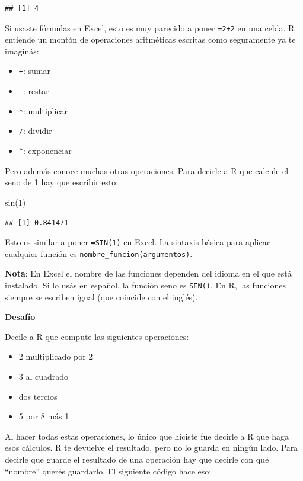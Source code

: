 \documentclass[
  openany]{book}
\newenvironment{Shaded}{\begin{snugshade}}{\end{snugshade}}
\newcommand{\DecValTok}[1]{\textcolor[rgb]{0.00,0.00,0.81}{#1}}
\newcommand{\FunctionTok}[1]{\textcolor[rgb]{0.00,0.00,0.00}{#1}}
\newcommand{\NormalTok}[1]{#1}
\providecommand{\tightlist}{%
  \setlength{\itemsep}{0pt}\setlength{\parskip}{0pt}}
\begin{document}
\begin{verbatim}
## [1] 4
\end{verbatim}

Si usaste fórmulas en Excel, esto es muy parecido a poner \texttt{=2+2} en una celda.
R entiende un montón de operaciones aritméticas escritas como seguramente ya te imaginás:

\begin{itemize}
\tightlist
\item
  \texttt{+}: sumar
\item
  \texttt{-}: restar
\item
  \texttt{*}: multiplicar
\item
  \texttt{/}: dividir
\item
  \texttt{\^{}}: exponenciar
\end{itemize}

Pero además conoce muchas otras operaciones.
Para decirle a R que calcule el seno de 1 hay que escribir esto:

\begin{Shaded}
\begin{Highlighting}[]
\FunctionTok{sin}\NormalTok{(}\DecValTok{1}\NormalTok{)}
\end{Highlighting}
\end{Shaded}

\begin{verbatim}
## [1] 0.841471
\end{verbatim}

Esto es similar a poner \texttt{=SIN(1)} en Excel.
La sintaxis básica para aplicar cualquier función es \texttt{nombre\_funcion(argumentos)}.

\textbf{Nota}: En Excel el nombre de las funciones dependen del idioma en el que está instalado.
Si lo usás en español, la función seno es \texttt{SEN()}.
En R, las funciones siempre se escriben igual (que coincide con el inglés).

\textbf{Desafío}

Decile a R que compute las siguientes operaciones:

\begin{itemize}
\tightlist
\item
  2 multiplicado por 2
\item
  3 al cuadrado
\item
  dos tercios
\item
  5 por 8 más 1
\end{itemize}

Al hacer todas estas operaciones, lo único que hiciste fue decirle a R que haga esos cálculos.
R te devuelve el resultado, pero no lo guarda en ningún lado.
Para decirle que guarde el resultado de una operación hay que decirle con qué ``nombre'' querés guardarlo.
El siguiente código hace eso:
\end{document}
